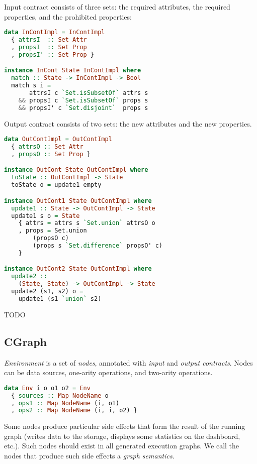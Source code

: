 Input contract consists of three sets: the required attributes, the required properties, and the prohibited properties:

\begin{lstlisting}[language=Haskell]
data InContImpl = InContImpl
  { attrsI  :: Set Attr
  , propsI  :: Set Prop
  , propsI' :: Set Prop }

instance InCont State InContImpl where
  match :: State -> InContImpl -> Bool
  match s i =
       attrsI c `Set.isSubsetOf` attrs s
    && propsI c `Set.isSubsetOf` props s
    && propsI' c `Set.disjoint`  props s
\end{lstlisting}

Output contract consists of two sets: the new attributes and the new properties.

\begin{lstlisting}[language=Haskell]
data OutContImpl = OutContImpl
  { attrsO :: Set Attr
  , propsO :: Set Prop }

instance OutCont State OutContImpl where
  toState :: OutContImpl -> State
  toState o = update1 empty

instance OutCont1 State OutContImpl where
  update1 :: State -> OutContImpl -> State
  update1 s o = State
    { attrs = attrs s `Set.union` attrsO o
    , props = Set.union
        (propsO c)
        (props s `Set.difference` propsO' c)
    }

instance OutCont2 State OutContImpl where
  update2 :: 
    (State, State) -> OutContImpl -> State
  update2 (s1, s2) o = 
    update1 (s1 `union` s2)
\end{lstlisting}

TODO

\subsection{CGraph}

{\em Environment} is a set of {\em nodes}, annotated with {\em input} and {\em output contracts}.
Nodes can be data sources, one-arity operations, and two-arity operations.

\begin{lstlisting}[language=Haskell]
data Env i o o1 o2 = Env
  { sources :: Map NodeName o
  , ops1 :: Map NodeName (i, o1)
  , ops2 :: Map NodeName (i, i, o2) }
\end{lstlisting}

Some nodes produce particular side effects that form the result of the running graph (writes data to the storage, displays some statistics on the dashboard, etc.).
Such nodes should exist in all generated execution graphs.
We call the nodes that produce such side effects a {\em graph semantics}.

